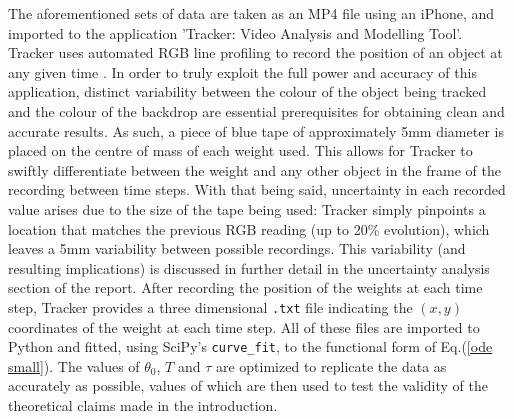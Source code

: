 The aforementioned sets of data are taken as an MP4 file using an iPhone, and imported to the application 'Tracker: Video Analysis and Modelling Tool'. Tracker uses automated RGB line profiling to record the position of an object at any given time \cite{tracker}. In order to truly exploit the full power and accuracy of this application, distinct variability between the colour of the object being tracked and the colour of the backdrop are essential prerequisites for obtaining clean and accurate results. As such, a piece of blue tape of approximately 5mm diameter is placed on the centre of mass of each weight used. This allows for Tracker to swiftly differentiate between the weight and any other object in the frame of the recording between time steps. With that being said, uncertainty in each recorded value arises due to the size of the tape being used: Tracker simply pinpoints a location that matches the previous RGB reading (up to 20\% evolution), which leaves a 5mm variability between possible recordings. This variability (and resulting implications) is discussed in further detail in the uncertainty analysis section of the report. After recording the position of the weights at each time step, Tracker provides a three dimensional \texttt{.txt} file indicating the $(x, y)$ coordinates of the weight at each time step. All of these files are imported to Python and fitted, using SciPy's \texttt{curve\_fit}, to the functional form of Eq.(\ref{ode small}). The values of $\theta_0$, $T$ and $\tau$ are optimized to replicate the data as accurately as possible, values of which are then used to test the validity of the theoretical claims made in the introduction. \\[0.20cm]
